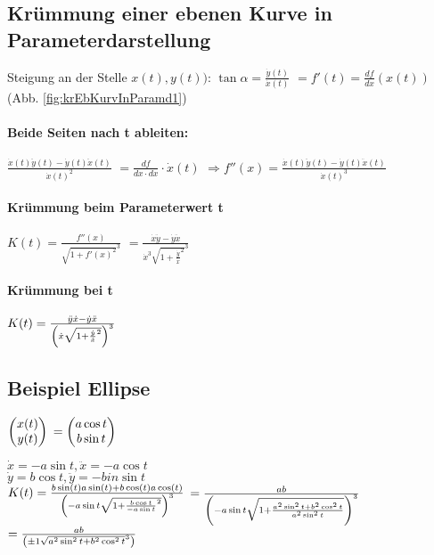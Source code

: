 \renewcommand{\ldate}{2015-10-30}

\subsection{Krümmung einer ebenen Kurve in Parameterdarstellung}

Steigung an der Stelle $ x(t), y(t))$: 
$\tan \alpha = \frac{\dot y (t)}{\dot x (t)}$
$=f'(t)= \frac{df}{dx} (x(t))$ (Abb. \ref{fig:krEbKurvInParamd1})

\paragraph{Beide Seiten nach t ableiten:}
$ \frac{\dot x(t) \ddot y(t) - \dot y(t) \ddot x(t)}{\dot x(t)^2}$
$=\frac{df}{dx \cdot dx} \cdot \dot x(t)$
$\Rightarrow f''(x) = \frac{\dot x(t) \ddot y(t) - \dot y(t) \ddot x(t)}{\dot x(t)^3}$

\paragraph{Krümmung beim Parameterwert t}
$ K(t) = \frac{f''(x)}{\sqrt{1+f'(x)^2}^3}$
$= \frac{\dot x \ddot y - \dot y \ddot x}{\dot x^3 \sqrt{1+\frac{\dot y}{\dot x}^2}^3}$

\paragraph{Krümmung bei t}
$ K(t) = \frac{\ddot y \dot x - \dot y \ddot x}{ \left( \dot x \sqrt{1+\frac{\dot y}{\dot x}^2} \right) ^3}$
 
\subsection{Beispiel Ellipse}
$  \begin{pmatrix} x(t) \\ y(t) \end{pmatrix} $
$= \begin{pmatrix} a \cos t \\ b \sin t \end{pmatrix} $

$\dot x = -a \sin t, \ddot x = -a \cos t$\\
$\dot y = b \cos t, \ddot y = -bin \sin t$\\

$K(t) = \frac{b \sin (t) a \sin (t) + b \cos (t) a \cos (t)}{ \left( - a \sin t \sqrt{1+\frac{b \cos t}{-a \sin t}^2} \right) ^3 }$
$= \frac{a b}{ \left( - a \sin t \sqrt{1+\frac{a^2 \sin^2 t + b^2 \cos^2 t}{a^2 \sin^2 t} } \right) ^3}$
$= \frac{a b}{ \left( \pm 1 \sqrt{a^2 \sin^2 t + b^2 \cos^2 t}^3 \right) }$


